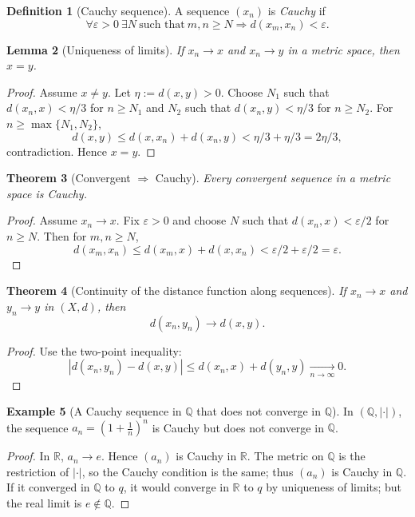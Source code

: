 \documentclass[11pt]{article}
\newtheorem{theorem}{Theorem}[section]
\newtheorem{lemma}[theorem]{Lemma}
\theoremstyle{definition}
\newtheorem{definition}[theorem]{Definition}
\newtheorem{example}[theorem]{Example}
\newcommand{\R}{\mathbb{R}}
\newcommand{\Q}{\mathbb{Q}}
\newcommand{\eps}{\varepsilon}
\begin{document}
\begin{definition}[Cauchy sequence]
A sequence $(x_n)$ is \emph{Cauchy} if
\[
\forall \eps>0\ \exists N\ \text{such that}\ m,n\ge N\Rightarrow d(x_m,x_n)<\eps.
\]
\end{definition}

\begin{lemma}[Uniqueness of limits]
If $x_n\to x$ and $x_n\to y$ in a metric space, then $x=y$.
\end{lemma}

\begin{proof}
Assume $x\ne y$. Let $\eta:=d(x,y)>0$. Choose $N_1$ such that $d(x_n,x)<\eta/3$ for $n\ge N_1$ and
$N_2$ such that $d(x_n,y)<\eta/3$ for $n\ge N_2$. For $n\ge \max\{N_1,N_2\}$,
\[
d(x,y)\le d(x,x_n)+d(x_n,y)<\eta/3+\eta/3=2\eta/3,
\]
contradiction. Hence $x=y$.
\end{proof}

\begin{theorem}[Convergent $\Rightarrow$ Cauchy]
Every convergent sequence in a metric space is Cauchy.
\end{theorem}

\begin{proof}
Assume $x_n\to x$. Fix $\eps>0$ and choose $N$ such that $d(x_n,x)<\eps/2$ for $n\ge N$.
Then for $m,n\ge N$,
\[
d(x_m,x_n)\le d(x_m,x)+d(x,x_n)<\eps/2+\eps/2=\eps.
\]
\end{proof}

\begin{theorem}[Continuity of the distance function along sequences]
If $x_n\to x$ and $y_n\to y$ in $(X,d)$, then
\[
d(x_n,y_n)\to d(x,y).
\]
\end{theorem}

\begin{proof}
Use the two-point inequality:
\[
|d(x_n,y_n)-d(x,y)|\le d(x_n,x)+d(y_n,y)\xrightarrow[n\to\infty]{}0.
\]
\end{proof}

\begin{example}[A Cauchy sequence in $\Q$ that does not converge in $\Q$]
In $(\Q,|\cdot|)$, the sequence $a_n=\left(1+\frac1n\right)^n$ is Cauchy but does not converge in $\Q$.
\end{example}

\begin{proof}
In $\R$, $a_n\to e$. Hence $(a_n)$ is Cauchy in $\R$. The metric on $\Q$ is the restriction of $|\cdot|$, so the Cauchy condition is the same; thus $(a_n)$ is Cauchy in $\Q$.
If it converged in $\Q$ to $q$, it would converge in $\R$ to $q$ by uniqueness of limits; but the real limit is $e\notin\Q$.
\end{proof}
\end{document}
